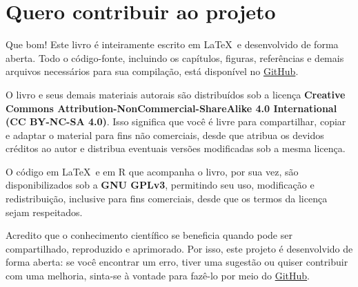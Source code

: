 \section*{Quero contribuir ao projeto}

Que bom! Este livro é inteiramente escrito em \LaTeX\ e desenvolvido de forma aberta. Todo o código-fonte, incluindo os capítulos, figuras, referências e demais arquivos necessários para sua compilação, está disponível no \href{https://github.com/brpmaltez/bph_book}{GitHub}.

O livro e seus demais materiais autorais são distribuídos sob a licença \textbf{Creative Commons Attribution-NonCommercial-ShareAlike 4.0 International (CC BY-NC-SA 4.0)}. Isso significa que você é livre para compartilhar, copiar e adaptar o material para fins não comerciais, desde que atribua os devidos créditos ao autor e distribua eventuais versões modificadas sob a mesma licença.

O código em \LaTeX\ e em R que acompanha o livro, por sua vez, são disponibilizados sob a \textbf{GNU GPLv3}, permitindo seu uso, modificação e redistribuição, inclusive para fins comerciais, desde que os termos da licença sejam respeitados.

Acredito que o conhecimento científico se beneficia quando pode ser compartilhado, reproduzido e aprimorado. Por isso, este projeto é desenvolvido de forma aberta: se você encontrar um erro, tiver uma sugestão ou quiser contribuir com uma melhoria, sinta-se à vontade para fazê-lo por meio do \href{https://github.com/brpmaltez/bph_book}{GitHub}.